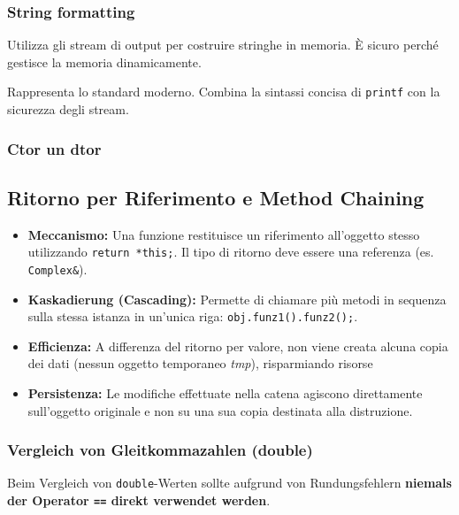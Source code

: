 \subsubsection{String formatting}
Utilizza gli stream di output per costruire stringhe in memoria. È sicuro perché gestisce la memoria dinamicamente.



Rappresenta lo standard moderno. Combina la sintassi concisa di \texttt{printf} con la sicurezza degli stream.



\subsubsection{Ctor un dtor}


\subsection{Ritorno per Riferimento e Method Chaining}
\begin{itemize}
    \item \textbf{Meccanismo:} Una funzione restituisce un riferimento all'oggetto stesso
    utilizzando \texttt{return *this;}. Il tipo di ritorno deve 
    essere una referenza (es. \texttt{Complex\&}).
    \item \textbf{Kaskadierung (Cascading):} Permette di chiamare più metodi in 
    sequenza sulla stessa istanza in un'unica riga: \texttt{obj.funz1().funz2();}.
    
    \item \textbf{Efficienza:} A differenza del ritorno per valore, 
    non viene creata alcuna copia dei dati (nessun oggetto temporaneo \textit{tmp}), 
    risparmiando risorse 
    \item \textbf{Persistenza:} Le modifiche effettuate nella catena agiscono 
    direttamente sull'oggetto originale e non su una sua copia destinata alla distruzione.
\end{itemize}



\subsubsection{Vergleich von Gleitkommazahlen (double)}
Beim Vergleich von \texttt{double}-Werten sollte aufgrund von Rundungsfehlern \textbf{niemals 
der Operator \texttt{==} direkt verwendet werden}. 

